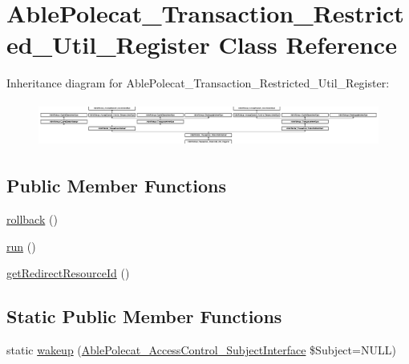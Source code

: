 \hypertarget{class_able_polecat___transaction___restricted___util___register}{}\section{Able\+Polecat\+\_\+\+Transaction\+\_\+\+Restricted\+\_\+\+Util\+\_\+\+Register Class Reference}
\label{class_able_polecat___transaction___restricted___util___register}
Inheritance diagram for Able\+Polecat\+\_\+\+Transaction\+\_\+\+Restricted\+\_\+\+Util\+\_\+\+Register\+:\begin{figure}[H]
\begin{center}
\leavevmode
\includegraphics[height=1.463415cm]{class_able_polecat___transaction___restricted___util___register}
\end{center}
\end{figure}
\subsection*{Public Member Functions}
\begin{DoxyCompactItemize}
\item 
\hyperlink{class_able_polecat___transaction___restricted___util___register_afa549adf79e3f8c09fe8f903dd5fbfa7}{rollback} ()
\item 
\hyperlink{class_able_polecat___transaction___restricted___util___register_afb0fafe7e02a3ae1993c01c19fad2bae}{run} ()
\item 
\hyperlink{class_able_polecat___transaction___restricted___util___register_abd12d28cbfdd5a45fba85bbac51a0b12}{get\+Redirect\+Resource\+Id} ()
\end{DoxyCompactItemize}
\subsection*{Static Public Member Functions}
\begin{DoxyCompactItemize}
\item 
static \hyperlink{class_able_polecat___transaction___restricted___util___register_a3f2135f6ad45f51d075657f6d20db2cd}{wakeup} (\hyperlink{interface_able_polecat___access_control___subject_interface}{Able\+Polecat\+\_\+\+Access\+Control\+\_\+\+Subject\+Interface} \$Subject=N\+U\+L\+L)
\end{DoxyCompactItemize}
